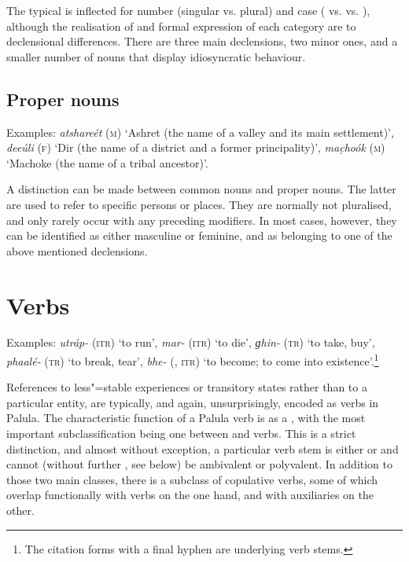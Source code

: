 The typical  is inflected for number (singular vs. plural) and case ( vs.  vs. ), although the realisation of and formal expression of each category are  to declensional differences. There are three main declensions, two minor ones, and a smaller number of nouns that display idiosyncratic  behaviour.


\subsection{Proper nouns}
\label{subsec:3b-2-1}
Examples: \textit{atshareét} (\textsc{m}) `Ashret (the name of a valley and its main settlement)', \textit{deeúli} (\textsc{f}) `Dir (the name of a district and a former principality)', \textit{mac̣hoók} (\textsc{m}) `Machoke (the name of a tribal ancestor)'.


A distinction can be made between common nouns and proper nouns. The latter are used to refer to specific persons or places. They are normally not pluralised, and only rarely occur with any preceding modifiers. In most cases, however, they can be identified as either masculine or feminine, and as belonging to one of the above mentioned declensions.

\section{Verbs}
\label{sec:3b-3}

Examples: \textit{utráp-} (\textsc{itr}) `to run', \textit{mar-} (\textsc{itr}) `to die', \textit{ɡhin-} (\textsc{tr}) `to take, buy', \textit{phaalé-} (\textsc{tr}) `to break, tear', \textit{bhe-} (, \textsc{itr}) `to become; to come into existence'.\footnote{The citation forms with a final hyphen are underlying  verb stems.}


References to less"=stable experiences or transitory states rather than to a particular entity, are typically, and again, unsurprisingly, encoded as verbs in Palula. The characteristic function of a Palula verb is as a , with the most important subclassification being one between  and  verbs. This is a strict distinction, and almost without exception, a particular verb stem is either  or  and cannot (without further , see below) be ambivalent or polyvalent. In addition to those two main classes, there is a subclass of copulative verbs, some of which overlap functionally with  verbs on the one hand, and with auxiliaries on the other.



